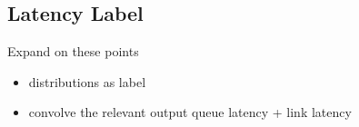 \documentclass[10pt,sigconf,letterpaper,anonymous,nonacm]{acmart}
\begin{document}
\subsection{Latency Label}
Expand on these points
\begin{itemize}
    \item distributions as label 
    \item convolve the relevant output queue latency + link latency
\end{itemize}





    


\end{document}
